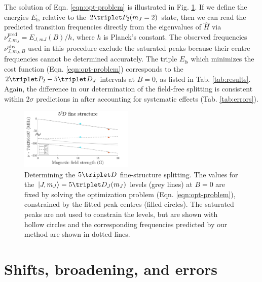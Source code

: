 The solution of Eqn.
	\ref{eqn:opt-problem} is illustrated in Fig.
	\ref{fig:fitting_3D}.
	If we define the energies $E_{\textrm{fs}}$ relative to the $2\triplet P_2(m_J=2)$ state, then we can read the predicted transition frequencies directly from the eigenvalues of $\hat{H}$ via $\nu_{J,m_J}^{\textrm{pred}}=E_{J,mJ}(B)/h$, where $h$ is Planck's constant.
	The observed frequencies $\nu_{J,m_J,B}^{\textrm{obs}}$ used in this procedure exclude the saturated peaks because their centre frequencies cannot be determined accurately.
	The triple $E_{\textrm{fs}}$ which minimizes the cost function (Eqn.
	\ref{eqn:opt-problem}) corresponds to the $2\triplet P_2 - 5\triplet D_J$ intervals at $B=0$, as listed in Tab.
	\ref{tab:results}.
	Again, the difference in our determination of the field-free splitting is consistent within 2$\sigma$ predictions in \cite{Drake07} after accounting for systematic effects (Tab.
	\ref{tab:errors}).
	

\begin{figure}[t]
    \centering
    \includegraphics[width=0.48\textwidth]{fig/spectroscopy/fitting-lines-eps-converted-to.pdf}
    \caption{Determining the $5\triplet D$ fine-structure splitting.
	The values for the $|J,m_J\rangle=5\triplet D_J(m_J)$ levels (grey lines) at $B=0$ are fixed by solving the optimization problem (Eqn.
	\ref{eqn:opt-problem}), constrained by the fitted peak centres (filled circles).
	The saturated peaks are not used to constrain the levels, but are shown with hollow circles and the corresponding frequencies predicted by our method are shown in dotted lines.}
    \label{fig:fitting_3D}
\end{figure}

\section{Shifts, broadening, and errors}

